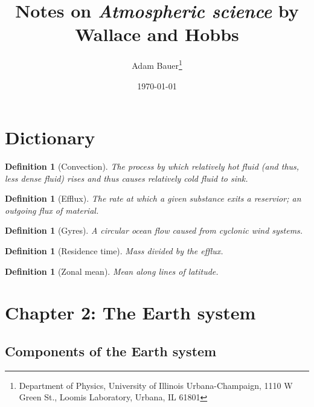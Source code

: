 \documentclass[11pt]{article}
\title{Notes on \textit{Atmospheric science} by Wallace and Hobbs}
\author{Adam Bauer\thanks{Department of Physics, University of Illinois Urbana-Champaign, 1110 W Green St., Loomis Laboratory, Urbana, IL 61801}}
\date{\today}
\numberwithin{equation}{section}
\newtheorem{Definition}[Theorem]{Definition}
\begin{document}
\maketitle


\tableofcontents 

\section{Dictionary}
\begin{Definition}[Convection]
The process by which relatively hot fluid (and thus, less dense fluid) rises and thus causes relatively cold fluid to sink.
\end{Definition}

\begin{Definition}[Efflux]
The rate at which a given substance exits a reservior; an outgoing flux of material.
\end{Definition}

\begin{Definition}[Gyres]
A circular ocean flow caused from cyclonic wind systems.
\end{Definition}

\begin{Definition}[Residence time]
Mass divided by the \textit{efflux}.
\end{Definition}

\begin{Definition}[Zonal mean]
Mean along lines of latitude.
\end{Definition}

\section{Chapter 2: The Earth system}

\subsection{Components of the Earth system}
\end{document}
